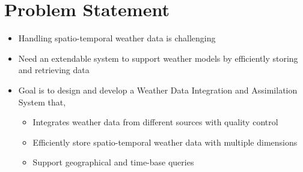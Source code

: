 \section{Problem Statement}
\begin{itemize}
    \item Handling spatio-temporal weather data is challenging
    \item Need an extendable system to support weather models by efficiently storing and retrieving data
    \item Goal is to design and develop a Weather Data Integration and Assimilation System that,
    \begin{itemize}
        \item Integrates weather data from different sources with quality control
        \item Efficiently store spatio-temporal weather data with multiple dimensions
        \item Support geographical and time-base queries
    \end{itemize}
\end{itemize}
